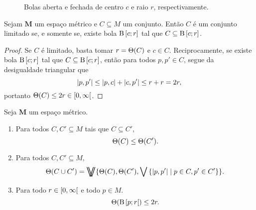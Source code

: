 \begin{figure}
\centering
{}\hspace{3cm}
\caption{Bolas aberta e fechada de centro $c$ e raio $r$, respectivamente.}
\end{figure}

\begin{proposition}
Sejam $\bm M$ um espaço métrico e $C \subseteq M$ um conjunto. Então $C$ é um conjunto limitado se, e somente se, existe bola $\mathrm{B}\left[{c};{r}\right]$ tal que $C \subseteq \mathrm{B}\left[{c};{r}\right]$.
\end{proposition}
\begin{proof}
Se $C$ é limitado, basta tomar $r=\Theta(C)$ e $c \in C$. Reciprocamente, se existe bola $\mathrm{B}\left[{c};{r}\right]$ tal que $C \subseteq \mathrm{B}\left[{c};{r}\right]$, então para todos $p,p' \in C$, segue da desigualdade triangular que
	\begin{equation*}
	\left\vert{p},{p'}\right\vert \leq \left\vert{p},{c}\right\vert+\left\vert{c},{p'}\right\vert \leq r+r=2r,
	\end{equation*}
portanto $\Theta(C) \leq 2r \in \left[{0},{\infty}\right[$.
\end{proof}

\begin{exercise}
Seja $\bm M$ um espaço métrico.
	\begin{enumerate}
	\item Para todos $C,C' \subseteq M$ tais que $C \subseteq C'$,
		\begin{equation*}
		\Theta(C) \leq \Theta (C').
		\end{equation*}

	\item Para todos $C, C' \subseteq M$,
		\begin{equation*}
		\diam(C \cup C') = \max \{ \diam(C),\diam(C'),\sup\set{\dist{p}{p'}}{p \in C, p' \in C'} \}.
		\end{equation*}


	\item Para todo $r \in \left[{0},{\infty}\right[$ e todo $p \in M$.
	\begin{equation*}
	\Theta(\mathrm{B}\left[{p};{r}\right[) \leq 2r.
	\end{equation*}
	\end{enumerate}
\end{exercise}

